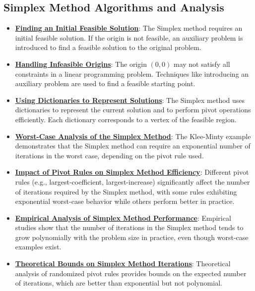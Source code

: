 \documentclass{article}%
\begin{document}
\subsection{Simplex Method Algorithms and Analysis}%
\label{subsec:SimplexMethodAlgorithmsandAnalysis}%
\begin{itemize}[leftmargin=*]%
\item \href{https://www.math.purdue.edu/~yipn/421/2024-08-27-ExSimplex.pdf#page=32}{\textbf{Finding an Initial Feasible Solution}}: The Simplex method requires an initial feasible solution. If the origin is not feasible, an auxiliary problem is introduced to find a feasible solution to the original problem.%
\item \href{https://www.math.purdue.edu/~yipn/421/2024-08-27-ExSimplex.pdf#page=30}{\textbf{Handling Infeasible Origins}}: The origin $(0, 0)$ may not satisfy all constraints in a linear programming problem. Techniques like introducing an auxiliary problem are used to find a feasible starting point.%
\item \href{https://www.math.purdue.edu/~yipn/421/2024-08-27-ExSimplex.pdf#page=26}{\textbf{Using Dictionaries to Represent Solutions}}: The Simplex method uses dictionaries to represent the current solution and to perform pivot operations efficiently. Each dictionary corresponds to a vertex of the feasible region.%
\item \href{https://www.math.purdue.edu/~yipn/421/2024-09-05-SimplexEfficiency.pdf#page=2}{\textbf{Worst-Case Analysis of the Simplex Method}}: The Klee-Minty example demonstrates that the Simplex method can require an exponential number of iterations in the worst case, depending on the pivot rule used.%
\item \href{https://www.math.purdue.edu/~yipn/421/2024-09-05-SimplexEfficiency.pdf#page=3}{\textbf{Impact of Pivot Rules on Simplex Method Efficiency}}: Different pivot rules (e.g., largest-coefficient, largest-increase) significantly affect the number of iterations required by the Simplex method, with some rules exhibiting exponential worst-case behavior while others perform better in practice.%
\item \href{https://www.math.purdue.edu/~yipn/421/2024-09-05-SimplexEfficiency.pdf#page=9}{\textbf{Empirical Analysis of Simplex Method Performance}}: Empirical studies show that the number of iterations in the Simplex method tends to grow polynomially with the problem size in practice, even though worst-case examples exist.%
\item \href{https://www.math.purdue.edu/~yipn/421/2024-09-05-SimplexEfficiency.pdf#page=10}{\textbf{Theoretical Bounds on Simplex Method Iterations}}: Theoretical analysis of randomized pivot rules provides bounds on the expected number of iterations, which are better than exponential but not polynomial.%

\end{itemize}
\end{document}
